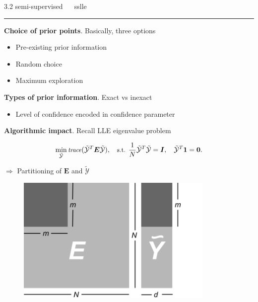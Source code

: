\documentclass[11pt, compress, t, notes = noshow, xcolor = table, 
aspectratio = 1610]{beamer}
\newcommand{\highlight}[1]{\textcolor{highlightcol}{\textbf{#1}}}
\newcommand{\arritem}{\item[\highlight{$\rightarrow$}]}
\newcommand{\Y}{\mathcal{Y}}
\newcommand{\E}{\bm{E}}
\newcommand{\I}{\bm{I}}
\begin{document}

\LARGE
\begin{frame}{\textcolor{gray!90}{3.2 semi-supervised} ~~ sslle}
\normalsize
\vspace{-0.5cm}
\noindent \textcolor{gray!90}{\rule{\textwidth}{1pt}}
\smallskip

\textbf{Choice of prior points}. Basically, three options

\begin{itemize}
  \arritem Pre-existing prior information
  \arritem Random choice
  \arritem Maximum exploration
\end{itemize}

\vspace{0.3cm}

\textbf{Types of prior information}. Exact vs inexact
\begin{itemize}
  \arritem Level of confidence encoded in confidence parameter
\end{itemize}

\vspace{0.3cm}

\begin{minipage}[c]{0.67\textwidth}
  \textbf{Algorithmic impact}. Recall LLE eigenvalue problem
  \begin{fleqn}
    \begin{equation*}
      \small
      \min_{\tilde{\Y}} \text{\textit{trace}}(\tilde{\Y}^T \E \tilde{\Y}), \quad
      \text{s.t. } \frac{1}{N} \tilde{\Y}^T \tilde{\Y} = \I, \quad
      \tilde{\Y}^T\bm{1} = \bm{0}.
    \end{equation*}
  \end{fleqn}
  $\Rightarrow$ Partitioning of $\E$ and $\tilde{\Y}$ 
\end{minipage}%
\begin{minipage}[c]{0.33\textwidth}
  \begin{figure}[H]
    \includegraphics[trim = 0 0 0 0, clip, %
      width = 0.85\textwidth]{figures/matrix_partition}
  \end{figure}
\end{minipage}

\end{frame}
\end{document}

